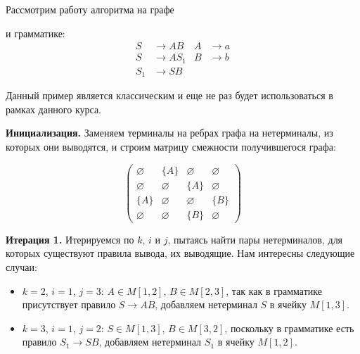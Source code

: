 \begin{example}
    \label{CYK_algorithm_ex}
    Рассмотрим работу алгоритма на графе

    \begin{center}
        
    \end{center}

    и грамматике:
    \begin{align*}
        S   & \to A B   & A & \to a \\
        S   & \to A S_1 & B & \to b \\
        S_1 & \to S B   &   &
    \end{align*}

    Данный пример является классическим и еще не раз будет использоваться в рамках данного курса.

    \textbf{Инициализация.}
    Заменяем терминалы на ребрах графа на нетерминалы, из которых они выводятся, и строим матрицу смежности получившегося графа:

    \begin{center}
        
    \end{center}

    \[
        \begin{pmatrix}
            \varnothing & \{A\}       & \varnothing & \varnothing \\
            \varnothing & \varnothing & \{A\}       & \varnothing \\
            \{A\}       & \varnothing & \varnothing & \{B\}       \\
            \varnothing & \varnothing & \{B\}       & \varnothing
        \end{pmatrix}
    \]

    \textbf{Итерация 1.}
    Итерируемся по $k$, $i$ и $j$, пытаясь найти пары нетерминалов, для которых существуют правила вывода, их выводящие.
    Нам интересны следующие случаи:
    \begin{itemize}
        \item $k = 2$, $i = 1$, $j = 3$: $A \in M[1, 2]$, $B \in M[2, 3]$, так как в грамматике присутствует правило $S \to A B$, добавляем нетерминал $S$ в ячейку $M[1, 3]$.
        \item $k = 3$, $i = 1$, $j = 2$: $S \in M[1, 3]$, $B \in M[3, 2]$, поскольку в грамматике есть правило $S_1 \to S B$, добавляем нетерминал $S_1$ в ячейку $M[1, 2]$.
    \end{itemize}


\end{example}
